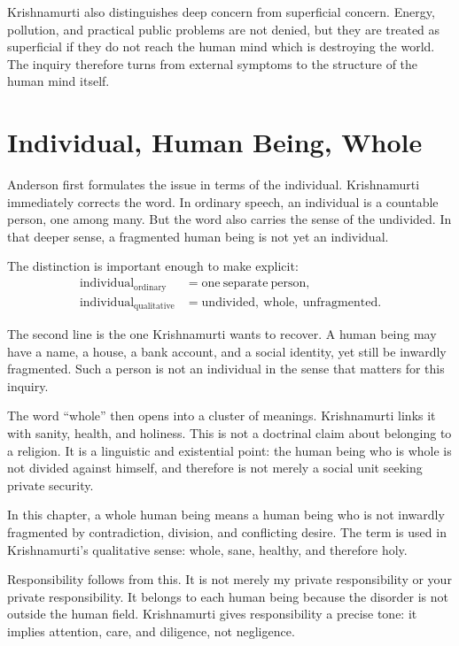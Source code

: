 Krishnamurti also distinguishes deep concern from superficial concern. Energy, pollution, and practical public problems are not denied, but they are treated as superficial if they do not reach the human mind which is destroying the world. The inquiry therefore turns from external symptoms to the structure of the human mind itself.

\section{Individual, Human Being, Whole}

Anderson first formulates the issue in terms of the individual. Krishnamurti immediately corrects the word. In ordinary speech, an individual is a countable person, one among many. But the word also carries the sense of the undivided. In that deeper sense, a fragmented human being is not yet an individual.

The distinction is important enough to make explicit:
\begin{align}
\mathrm{individual}_{\mathrm{ordinary}}
&= \mathrm{one\ separate\ person},\\
\mathrm{individual}_{\mathrm{qualitative}}
&= \mathrm{undivided,\ whole,\ unfragmented}.
\end{align}

The second line is the one Krishnamurti wants to recover. A human being may have a name, a house, a bank account, and a social identity, yet still be inwardly fragmented. Such a person is not an individual in the sense that matters for this inquiry.

The word ``whole'' then opens into a cluster of meanings. Krishnamurti links it with sanity, health, and holiness. This is not a doctrinal claim about belonging to a religion. It is a linguistic and existential point: the human being who is whole is not divided against himself, and therefore is not merely a social unit seeking private security.

\begin{definition}
In this chapter, a whole human being means a human being who is not inwardly fragmented by contradiction, division, and conflicting desire. The term is used in Krishnamurti's qualitative sense: whole, sane, healthy, and therefore holy.
\end{definition}

Responsibility follows from this. It is not merely my private responsibility or your private responsibility. It belongs to each human being because the disorder is not outside the human field. Krishnamurti gives responsibility a precise tone: it implies attention, care, and diligence, not negligence.

